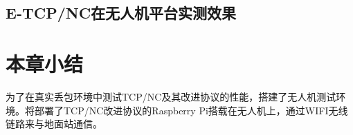 \subsection{E-TCP/NC在无人机平台实测效果}
\section{本章小结}
为了在真实丢包环境中测试TCP/NC及其改进协议的性能，搭建了无人机测试环境。将部署了TCP/NC改进协议的Raspberry Pi搭载在无人机上，通过WIFI无线链路来与地面站通信。 